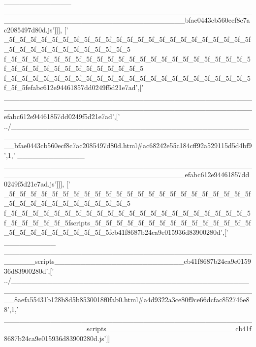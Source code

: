 \begin{DoxyCode}
{      \_\_\_\_\_\_\_\_\_\_\_\_\_
      \_\_\_\_\_\_\_\_\_\_\_\_\_\_\_\_\_\_\_\_\_\_\_\_\_\_\_\_\_\_\_\_\_\_\_\_\_\_\_\_\_\_\_\_\_\_\_\_\_\_\_\_\_\_\_\_\_\_\_\_\_\_\_\_\_\_\_\_\_\_\_\_\_\_\_\_\_\_\_\_\_\_\_bfae0443cb560ecf8c7ac2085497d80d.js'}]]],
  [\textcolor{stringliteral}{'
      \_5f\_5f\_5f\_5f\_5f\_5f\_5f\_5f\_5f\_5f\_5f\_5f\_5f\_5f\_5f\_5f\_5f\_5f\_5f\_5f\_5f\_5f\_5f\_5f\_5f\_5f\_5f\_5f\_5f\_5f\_5f\_5f\_5f\_5f\_5
      f\_5f\_5f\_5f\_5f\_5f\_5f\_5f\_5f\_5f\_5f\_5f\_5f\_5f\_5f\_5f\_5f\_5f\_5f\_5f\_5f\_5f\_5f\_5f\_5f\_5f\_5f\_5f\_5f\_5f\_5f\_5f\_5f\_5f\_5f\_5f\_5
      f\_5f\_5f\_5f\_5f\_5f\_5f\_5f\_5f\_5f\_5f\_5f\_5f\_5f\_5f\_5f\_5f\_5f\_5f\_5f\_5f\_5f\_5f\_5f\_5f\_5fefabc612e94461857dd0249f5d21e7ad'},[\textcolor{stringliteral}{'
      \_\_\_\_\_\_\_\_\_\_\_\_\_\_\_\_\_\_\_\_\_\_\_\_\_\_\_\_\_\_\_\_\_\_\_\_\_\_\_\_\_\_\_\_\_\_\_\_\_\_\_\_\_\_\_\_\_\_\_\_\_\_\_\_\_\_\_\_\_\_\_\_\_\_\_\_\_\_\_\_\_\_\_\_\_\_\_\_\_\_\_\_\_\_\_\_efabc612e94461857dd0249f5d21e7ad'},[\textcolor{stringliteral}{'
      ../\_\_\_\_\_\_\_\_\_\_\_\_\_\_\_\_\_\_\_\_\_\_\_\_\_\_\_\_\_\_\_\_\_\_\_\_\_\_\_\_\_\_\_\_\_\_\_\_\_\_\_\_\_\_\_\_\_\_\_\_\_\_\_\_\_\_\_\_\_\_\_\_\_\_\_\_\_\_\_\_\_\_\_\_\_\_\_\_\_\_\_\_\_\_\_\_bfae0443cb560ecf8c7ac2085497d80d.html#ac68242e55c184cff92a529115d5d4bf9'},1,\textcolor{stringliteral}{'
      \_\_\_\_\_\_\_\_\_\_\_\_\_
      \_\_\_\_\_\_\_\_\_\_\_\_\_\_\_\_\_\_\_\_\_\_\_\_\_\_\_\_\_\_\_\_\_\_\_\_\_\_\_\_\_\_\_\_\_\_\_\_\_\_\_\_\_\_\_\_\_\_\_\_\_\_\_\_\_\_\_\_\_\_\_\_\_\_\_\_\_\_\_\_\_\_\_efabc612e94461857dd0249f5d21e7ad.js'}]]],
  [\textcolor{stringliteral}{'
      \_5f\_5f\_5f\_5f\_5f\_5f\_5f\_5f\_5f\_5f\_5f\_5f\_5f\_5f\_5f\_5f\_5f\_5f\_5f\_5f\_5f\_5f\_5f\_5f\_5f\_5f\_5f\_5f\_5f\_5f\_5f\_5f\_5f\_5f\_5
      f\_5f\_5f\_5f\_5f\_5f\_5f\_5f\_5f\_5f\_5f\_5f\_5f\_5f\_5f\_5f\_5f\_5f\_5f\_5f\_5f\_5f\_5f\_5f\_5f\_5f\_5f\_5f\_5f\_5fscripts\_5f\_5f\_5f\_5f\_5f\_5f\_5f\_5f\_5f\_5f\_5f\_5f\_5f\_5f\_5f\_5f\_5f\_5f\_5f\_5f\_5f\_5f\_5f\_5f\_5fcb41f8687b24ca9e015936d83900280d'},[\textcolor{stringliteral}{'
      \_\_\_\_\_\_\_\_\_\_
      \_\_\_\_\_\_\_\_\_\_\_\_\_\_\_\_\_\_\_\_\_\_\_\_\_\_\_\_\_\_\_\_\_\_\_\_\_\_\_\_\_\_\_\_\_\_\_\_\_\_\_\_\_\_scripts\_\_\_\_\_\_\_\_\_\_\_\_\_\_\_\_\_\_\_\_\_\_\_\_\_cb41f8687b24ca9e015936d83900280d'},[\textcolor{stringliteral}{'
      ../\_\_\_\_\_\_\_\_\_\_\_\_\_\_\_\_\_\_\_\_\_\_\_\_\_\_\_\_\_\_\_\_\_\_\_\_\_\_\_\_\_\_\_\_\_\_\_\_\_\_\_\_\_\_\_\_\_\_\_\_\_\_\_\_\_\_\_\_\_\_\_\_\_\_\_\_\_\_\_\_\_\_\_\_\_\_\_\_\_\_\_\_\_\_\_\_8aefa55431b128b8d5b8530018f0fab0.html#a4d9322a3ce80f9ce66dcfac852746e88'},1,\textcolor{stringliteral}{'
      \_\_\_\_\_\_\_\_\_\_\_\_\_\_\_\_\_\_\_\_\_\_\_\_\_\_\_\_\_\_\_\_\_\_\_\_\_\_\_\_\_\_\_\_\_\_\_\_\_\_\_\_\_\_\_\_\_\_\_\_\_\_\_\_scripts\_\_\_\_\_\_\_\_\_\_\_\_\_\_\_\_\_\_\_\_\_\_\_\_\_cb41f8687b24ca9e015936d83900280d.js'}]]

\end{DoxyCode}
